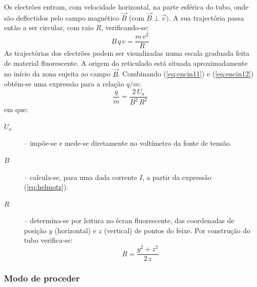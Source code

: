 \documentclass[a4paper,twoside,11pt]{report}      %
\begin{document}
Os electrões entram, com velocidade horizontal, na parte esférica do tubo, onde são deflectidos pelo campo magnético $\vec{B}$ (com $\vec{B}\perp\vec{v})$. A sua trajectória passa então a ser circular, com raio $R$, verificando-se:
\begin{equation}
	\label{eq:encin12}
B \, q\, v = \frac{m\,v^2}{R} 
\end{equation}
As trajectórias dos electrões podem ser visualizadas numa escala graduada feita de material fluorescente. 
A origem do reticulado está situada aproximadamente no início da zona 
sujeita ao campo $\vec{B}$.
Combinando (\ref{eq:encin11}) e (\ref{eq:encin12}) obtém-se uma expressão para a relação $q/m$:
\begin{equation}
	\label{eq:encin3}
 \frac{q}{m} = \frac{2\, U_a}{B^2\,R^2} 
\end{equation}
em que:
\begin{description}
\item[$U_a$] – impõe-se e mede-se diretamente no voltímetro da fonte de tensão.
\item[$B$] – calcula-se, para uma dada corrente $I$, a partir da expressão (\ref{eq:helmotz}).
\item[$R$] – determina-se por leitura no écran fluorescente, das coordenadas de posição $y$ (horizontal) e $z$ (vertical) de pontos do feixe. Por construção do tubo verifica-se:
\begin{equation}
	\label{eq:eR}
 R = \frac{y^2 + z^2}{2 \, z} 
\end{equation}
\end{description}



\subsubsection{\sf Modo de proceder}
\end{document}
